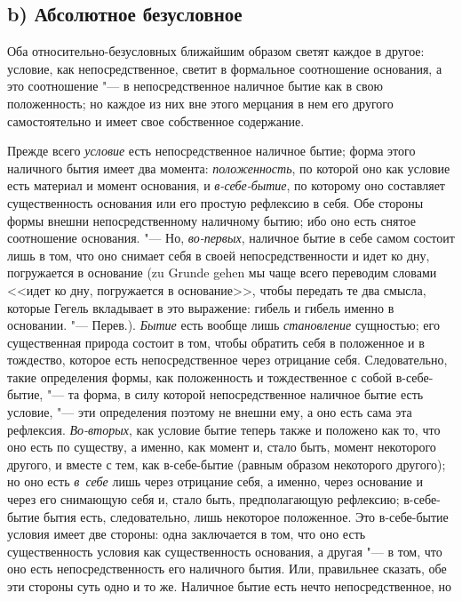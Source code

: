 \subsection[b) Абсолютное безусловное]{b) Абсолютное безусловное}

Оба относительно-безусловных ближайшим образом
светят каждое в другое: условие, как непосредственное, светит в формальное
соотношение основания, а это соотношение "--- в непосредственное наличное
бытие как в свою положенность; но каждое из них вне этого мерцания в нем
его другого самостоятельно и имеет свое собственное содержание.

Прежде всего {\em условие} есть непосредственное
наличное бытие; форма этого наличного бытия имеет два момента:
{\em положенность}, по которой оно как условие есть
материал и момент основания, и {\em в-себе-бытие}, по
которому оно составляет существенность основания или его простую рефлексию
в себя. Обе стороны формы внешни непосредственному наличному бытию; ибо оно
есть снятое соотношение основания. "--- Но,
{\em во-первых}, наличное бытие в себе самом состоит
лишь в том, что оно снимает себя в своей непосредственности и идет ко дну,
погружается в основание (zu Grunde gehen мы чаще всего переводим словами
<<идет ко дну, погружается в основание>>, чтобы передать те два смысла,
которые Гегель вкладывает в это выражение: гибель и гибель именно в
основании. "--- Перев.). {\em Бытие} есть вообще лишь
{\em становление} сущностью; его существенная природа
состоит в том, чтобы обратить себя в положенное и в тождество, которое есть
непосредственное через отрицание себя. Следовательно, такие определения
формы, как положенность и тождественное с собой в-себе-бытие, "--- та форма, в
силу которой непосредственное наличное бытие есть условие, "--- эти
определения поэтому не внешни ему, а оно есть сама эта рефлексия.
{\em Во-вторых}, как условие бытие теперь также и
положено как то, что оно есть по существу, а именно, как момент и, стало
быть, момент некоторого другого, и вместе с тем, как в-себе-бытие (равным
образом некоторого другого); но оно есть {\em в~себе}
лишь через отрицание себя, а именно, через основание и через его снимающую
себя и, стало быть, предполагающую рефлексию; в-себе-бытие бытия есть,
следовательно, лишь некоторое положенное. Это в-себе-бытие условия имеет
две стороны: одна заключается в том, что оно есть существенность условия
как существенность основания, а другая "--- в том, что оно есть
непосредственность его наличного бытия. Или, правильнее сказать, обе эти
стороны суть одно и то же. Наличное бытие есть нечто непосредственное, но
